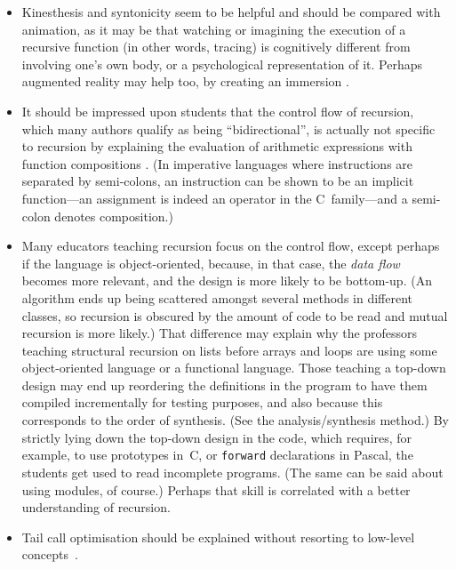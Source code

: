 \documentclass[11pt,a4paper]{article}
\newcommand\plang[1]{\textsf{#1}\xspace}
\newcommand\exc[1]{\texttt{\small #1}}
\begin{document}
\begin{itemize}
\item Kinesthesis and syntonicity seem to be helpful and should be
  compared with animation, as it may be that watching or imagining the
  execution of a recursive function (in other words, tracing) is
  cognitively different from involving one's own body, or a
  psychological representation of it. Perhaps augmented reality may
  help too, by creating an immersion
  \citep{TasconRinderknechtKimKim:2010}.

\item It should be impressed upon students that the control flow of
  recursion, which many authors qualify as being ``bidirectional'', is
  actually not specific to recursion by explaining the evaluation of
  arithmetic expressions with function compositions
  \citep{Burge:1975}. (In imperative languages where instructions are
  separated by semi\hyp{}colons, an instruction can be shown to be an
  implicit function---an assignment is indeed an operator in the
  \plang{C}~family---and a semi\hyp{}colon denotes composition.)

\item Many educators teaching recursion focus on the control flow,
  except perhaps if the language is object\hyp{}oriented, because, in
  that case, the \emph{data flow} becomes more relevant, and the
  design is more likely to be bottom\hyp{}up. (An algorithm ends up
  being scattered amongst several methods in different classes, so
  recursion is obscured by the amount of code to be read and mutual
  recursion is more likely.) That difference may explain why the
  professors teaching structural recursion on lists before arrays and
  loops are using some object\hyp{}oriented language or a functional
  language. Those teaching a top\hyp{}down design may end up
  reordering the definitions in the program to have them compiled
  incrementally for testing purposes, and also because this
  corresponds to the order of synthesis. (See the analysis/synthesis
  method.) By strictly lying down the top\hyp{}down design in the
  code, which requires, for example, to use prototypes in~\plang{C},
  or \exc{forward} declarations in \plang{Pascal}, the students get
  used to read incomplete programs. (The same can be said about using
  modules, of course.) Perhaps that skill is correlated with a better
  understanding of recursion.

\item Tail call optimisation should be explained without resorting to
  low\hyp{}level concepts~\citep{Rinderknecht:2012}.

\end{itemize}
\end{document}
